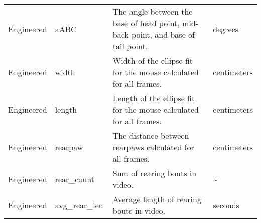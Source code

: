 \documentclass[11pt,reqno]{amsart}
\begin{document}
\begin{longtable}[c]{|p{0.15\linewidth}|p{0.23\linewidth}|p{0.45\linewidth}|p{0.18\linewidth}|}
Engineered       & aABC                     & The angle between the base of head point, mid-back point, and base of tail point.                                                                                                                                                                                                       & degrees             \\[.5cm]
Engineered       & width                    & Width of the ellipse fit for the mouse calculated for all frames.                                                                                                                                                                                                                       & centimeters         \\[.5cm]
Engineered       & length                   & Length of the ellipse fit for the mouse calculated for all frames.                                                                                                                                                                                                                      & centimeters         \\[.5cm]
Engineered       & rearpaw                  & The distance between rearpaws calculated for all frames.                                                                                                                                                                                                                                & centimeters         \\[.3cm]
Engineered       & rear\_count              & Sum of rearing bouts in video.                                                                                                                                                                                                                                                          & \textasciitilde{}   \\[.4cm]
Engineered       & avg\_rear\_len           & Average length of rearing bouts in video.                                                                                                                                                                                                                                               & seconds            



 \end{longtable}
\end{document}
